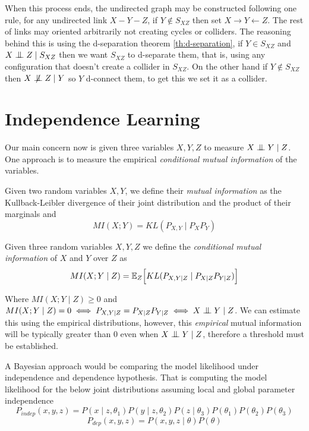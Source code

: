 When this process ends, the undirected graph may be constructed following one rule,
for any undirected link \(X - Y - Z\), if \(Y \notin S_{XZ}\) then set
\(X \to Y \leftarrow Z\). The rest of links may oriented arbitrarily not
creating cycles or colliders. The reasoning behind this is using the
d-separation theorem \ref{th:d-separation}, if \(Y \in S_{XZ}\) and
\(X \bigCI Z \mid S_{XZ}\) then we want \(S_{XZ}\) to d-separate them, that is,
using any configuration that doesn't create a collider in \(S_{XZ}\). On the
other hand if \(Y \notin S_{XZ}\) then \(X \bigCD Z \mid Y\) so \(Y\) d-connect
them, to get this we set it as a collider.

\section{Independence Learning}

Our main concern now is given three variables \(X, Y, Z\) to measure \(X \bigCI Y \mid Z\). One approach is to measure the empirical \emph{conditional mutual information} of the variables.

\begin{definition}
  Given two random variables \(X, Y\), we define their \emph{mutual information} as the Kullback-Leibler divergence of their joint distribution and the product of their marginals and
  \[
    MI(X;Y) = KL(P_{X,Y}\mid P_{X}P_{Y})
  \]
\end{definition}

\begin{definition}
  Given three random variables \(X, Y, Z\) we define the \emph{conditional mutual information} of \(X\) and \(Y\) over \(Z\) as
  \[
    MI(X;Y\mid Z) = \mathbb{E}_{Z}\Big[KL(P_{X,Y \mid Z} \mid P_{X\mid Z} P_{Y \mid Z})\Big]
  \]
\end{definition}
Where \(MI(X;Y \mid Z) \geq 0\) and \(MI(X;Y \mid Z) = 0 \iff P_{X,Y \mid Z} = P_{X\mid Z} P_{Y \mid Z} \iff X\bigCI Y \mid Z\). We can estimate this using the empirical distributions, however, this \emph{empirical} mutual information will be typically greater than \(0\) even when \(X\bigCI Y \mid Z\), therefore a threshold must be established.

A Bayesian approach would be comparing the model likelihood under independence and dependence hypothesis. That is computing the model likelihood for the below joint distributions assuming local and global parameter independence
\[
  P_{indep}(x,y,z) = P(x\mid z, \theta_{1})P(y \mid z, \theta_{2})P(z \mid \theta_{3})P(\theta_{1})P(\theta_{2})P(\theta_{3})
\]
\[
P_{dep}(x,y,z) = P(x,y,z \mid \theta)P(\theta)
\]
